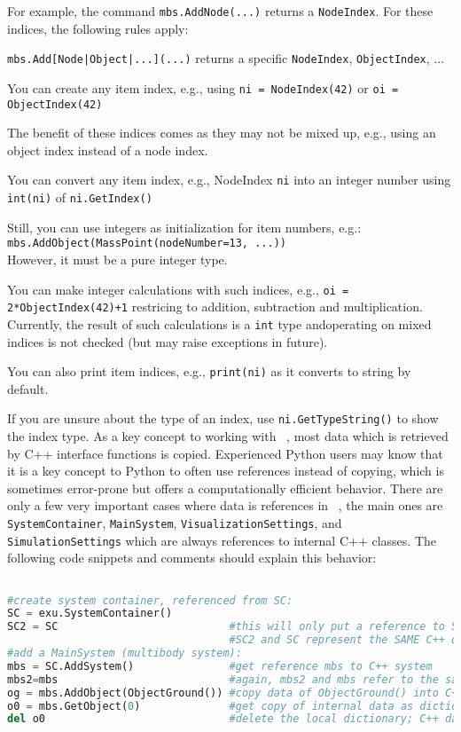 For example, the command \texttt{mbs.AddNode(...)} returns a \texttt{NodeIndex}. For these indices, the following rules apply:
\bi
\item[] \texttt{mbs.Add[Node|Object|...](...)} returns a specific \texttt{NodeIndex}, \texttt{ObjectIndex}, ...
\item[] You can create any item index, e.g., using \texttt{ni = NodeIndex(42)} or \texttt{oi = ObjectIndex(42)}
\item[] The benefit of these indices comes as they may not be mixed up, e.g., using an object index instead of a node index.
\item[] You can convert any item index, e.g., NodeIndex \texttt{ni} into an integer number using \texttt{int(ni)} of \texttt{ni.GetIndex()}
\item[] Still, you can use integers as initialization for item numbers, e.g.:\\\texttt{mbs.AddObject(MassPoint(nodeNumber=13, ...))}\\However, it must be a pure integer type.
\item[] You can make integer calculations with such indices, e.g., \texttt{oi = 2*ObjectIndex(42)+1} restricing to addition, subtraction and multiplication. Currently, the result of such calculations is a \texttt{int} type andoperating on mixed indices is not checked (but may raise exceptions in future).
\item[] You can also print item indices, e.g., \texttt{print(ni)} as it converts to string by default.
\item[] If you are unsure about the type of an index, use \texttt{ni.GetTypeString()} to show the index type.
\ei
{}
\label{sec:generalPythonInterface:copyref}
As a key concept to working with \codeName\ , most data which is retrieved by C++ interface functions is copied.
Experienced Python users may know that it is a key concept to Python to often use references instead of copying, which is
sometimes error-prone but offers a computationally efficient behavior.
There are only a few very important cases where data is references in \codeName\ , the main ones are 
\texttt{SystemContainer}, 
\texttt{MainSystem}, 
\texttt{VisualizationSettings}, and
\texttt{SimulationSettings} which are always references to internal C++ classes.
The following code snippets and comments should explain this behavior:
\pythonstyle
\begin{lstlisting}[language=Python, firstnumber=1]

#create system container, referenced from SC:
SC = exu.SystemContainer()
SC2 = SC                           #this will only put a reference to SC
                                   #SC2 and SC represent the SAME C++ object
#add a MainSystem (multibody system):
mbs = SC.AddSystem()               #get reference mbs to C++ system
mbs2=mbs                           #again, mbs2 and mbs refer to the same C++ object
og = mbs.AddObject(ObjectGround()) #copy data of ObjectGround() into C++
o0 = mbs.GetObject(0)              #get copy of internal data as dictionary
del o0                             #delete the local dictionary; C++ data not affected
\end{lstlisting}


